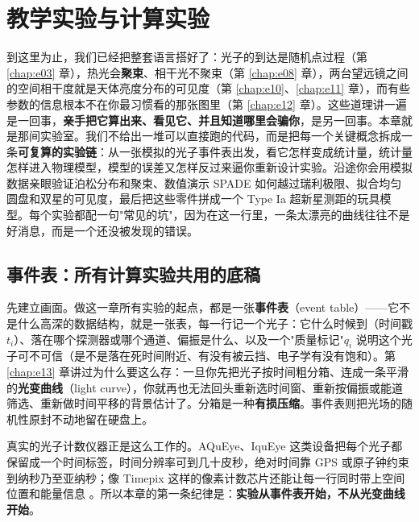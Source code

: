 \chapter{教学实验与计算实验}
\label{chap:e26}

\begin{chapteropening}
到这里为止，我们已经把整套语言搭好了：光子的到达是随机点过程（第 \ref{chap:e03} 章），热光会\textbf{聚束}、相干光不聚束（第 \ref{chap:e08} 章），两台望远镜之间的空间相干度就是天体亮度分布的可见度（第 \ref{chap:e10}、\ref{chap:e11} 章），而有些参数的信息根本不在你最习惯看的那张图里（第 \ref{chap:e12} 章）。这些道理讲一遍是一回事，\textbf{亲手把它算出来、看见它、并且知道哪里会骗你}，是另一回事。本章就是那间实验室。我们不给出一堆可以直接跑的代码，而是把每一个关键概念拆成一条\textbf{可复算的实验链}：从一张模拟的光子事件表出发，看它怎样变成统计量，统计量怎样进入物理模型，模型的误差又怎样反过来逼你重新设计实验。沿途你会用模拟数据亲眼验证泊松分布和聚束、数值演示 SPADE 如何越过瑞利极限、拟合均匀圆盘和双星的可见度，最后把这些零件拼成一个 Type Ia 超新星测距的玩具模型。每个实验都配一句"常见的坑"，因为在这一行里，一条太漂亮的曲线往往不是好消息，而是一个还没被发现的错误。
\end{chapteropening}

\section{事件表：所有计算实验共用的底稿}
\label{sec:e26-eventtable}

先建立画面。做这一章所有实验的起点，都是一张\textbf{事件表}（event table）——它不是什么高深的数据结构，就是一张表，每一行记一个光子：它什么时候到（时间戳 \(t_i\)）、落在哪个探测器或哪个通道、偏振是什么、以及一个"质量标记"\(q_i\) 说明这个光子可不可信（是不是落在死时间附近、有没有被云挡、电子学有没有饱和）。第 \ref{chap:e13} 章讲过为什么要这么存：一旦你先把光子按时间粗分箱、连成一条平滑的\textbf{光变曲线}（light curve），你就再也无法回头重新选时间窗、重新按偏振或能道筛选、重新做时间平移的背景估计了。分箱是一种\textbf{有损压缩}。事件表则把光场的随机性原封不动地留在硬盘上。

真实的光子计数仪器正是这么工作的。AQuEye、IquEye 这类设备把每个光子都保留成一个时间标签，时间分辨率可到几十皮秒，绝对时间靠 GPS 或原子钟约束到纳秒乃至亚纳秒；像 Timepix 这样的像素计数芯片还能让每一行同时带上空间位置和能量信息 \citep{2016SPIE.9907E..0NZ,2015SPIE.9504E..0CZ,2007NIMPA.581..485L}。所以本章的第一条纪律是：\textbf{实验从事件表开始，不从光变曲线开始}。

